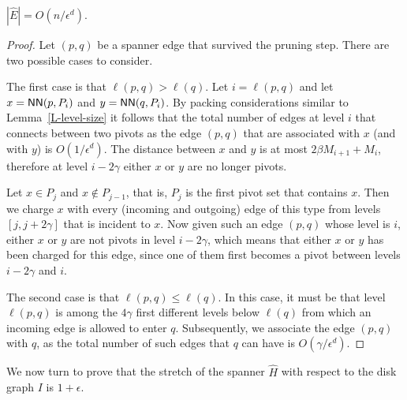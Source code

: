\documentclass[proceedings]{stacs}
\theoremstyle{plain}\newtheorem{satz}[thm]{Satz}
\theoremstyle{definition}\newtheorem{crucial}[thm]{Crucial Definition}
\newcommand{\eps}{\epsilon}
\newcommand{\NN}{\mbox{\sf NN}}
\begin{document}
\begin{lemma}\label{L-smaller}
$|\hat{E}| = O(n/\epsilon^d)$.
\end{lemma}
\begin{proof}
Let $(p,q)$ be a spanner edge that survived the pruning step.
There are two possible cases to consider.

The first case is that $\ell(p,q) > \ell(q)$. Let $i=\ell(p,q)$
and let $x=\NN(p,P_i)$ and $y=\NN(q,P_i)$. By packing
considerations similar to Lemma~\ref{L-level-size} it follows that
the total number of edges at level $i$ that connects between two
pivots as the edge $(p,q)$ that are associated with $x$ (and with
$y$) is $O(1/\epsilon^d)$. The distance between $x$ and $y$ is at
most $2\beta M_{i+1}+M_i$, therefore at level $i-2\gamma$ either
$x$ or $y$ are no longer pivots.

Let $x\in P_j$ and $x\not\in P_{j-1}$, that is, $P_j$ is the first
pivot set that contains $x$. Then we charge $x$ with every
(incoming and outgoing) edge of this type from levels
$[j,j+2\gamma]$ that is incident to $x$. Now given such an edge
$(p,q)$ whose level is $i$, either $x$ or $y$ are not pivots in
level $i-2\gamma$, which means that either $x$ or $y$ has been
charged for this edge, since one of them first becomes a pivot
between levels $i-2\gamma$ and $i$.

The second case is that $\ell(p,q) \leq \ell(q)$. In this case, it
must be that level $\ell(p,q)$  is among the $4\gamma$ first
different levels below $\ell(q)$ from which an incoming edge is
allowed to enter $q$. Subsequently, we associate the edge $(p,q)$
with $q$, as the total number of such edges that $q$ can have is
$O(\gamma / \epsilon^d)$.
\end{proof}


We now turn to prove that the stretch of the spanner $\hat{H}$
with respect to the disk graph $I$ is $1+\eps$.
\end{document}
